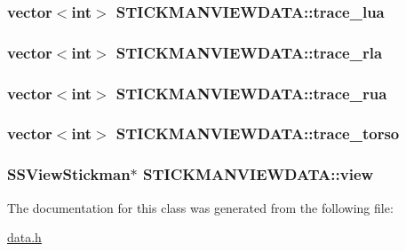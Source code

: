 \hypertarget{class_s_t_i_c_k_m_a_n_v_i_e_w_d_a_t_a_1e62afa43b4eab6af89183c8ad942471}{
\subsubsection[{trace\_\-lua}]{\setlength{\rightskip}{0pt plus 5cm}vector$<$int$>$ {\bf STICKMANVIEWDATA::trace\_\-lua}}}
\label{class_s_t_i_c_k_m_a_n_v_i_e_w_d_a_t_a_1e62afa43b4eab6af89183c8ad942471}


\hypertarget{class_s_t_i_c_k_m_a_n_v_i_e_w_d_a_t_a_7a15f72122d91ca427983e60be55b2bd}{
\subsubsection[{trace\_\-rla}]{\setlength{\rightskip}{0pt plus 5cm}vector$<$int$>$ {\bf STICKMANVIEWDATA::trace\_\-rla}}}
\label{class_s_t_i_c_k_m_a_n_v_i_e_w_d_a_t_a_7a15f72122d91ca427983e60be55b2bd}


\hypertarget{class_s_t_i_c_k_m_a_n_v_i_e_w_d_a_t_a_e2db8d5aa67e6872e4872e9c38490adb}{
\subsubsection[{trace\_\-rua}]{\setlength{\rightskip}{0pt plus 5cm}vector$<$int$>$ {\bf STICKMANVIEWDATA::trace\_\-rua}}}
\label{class_s_t_i_c_k_m_a_n_v_i_e_w_d_a_t_a_e2db8d5aa67e6872e4872e9c38490adb}


\hypertarget{class_s_t_i_c_k_m_a_n_v_i_e_w_d_a_t_a_4d790edf4557561818fcc772a48130da}{
\subsubsection[{trace\_\-torso}]{\setlength{\rightskip}{0pt plus 5cm}vector$<$int$>$ {\bf STICKMANVIEWDATA::trace\_\-torso}}}
\label{class_s_t_i_c_k_m_a_n_v_i_e_w_d_a_t_a_4d790edf4557561818fcc772a48130da}


\hypertarget{class_s_t_i_c_k_m_a_n_v_i_e_w_d_a_t_a_5752ac810d0bd7abc6d2111dd8aa1af7}{
\subsubsection[{view}]{\setlength{\rightskip}{0pt plus 5cm}SSViewStickman$\ast$ {\bf STICKMANVIEWDATA::view}}}
\label{class_s_t_i_c_k_m_a_n_v_i_e_w_d_a_t_a_5752ac810d0bd7abc6d2111dd8aa1af7}




The documentation for this class was generated from the following file:\begin{CompactItemize}
\item 
\hyperlink{data_8h}{data.h}\end{CompactItemize}
